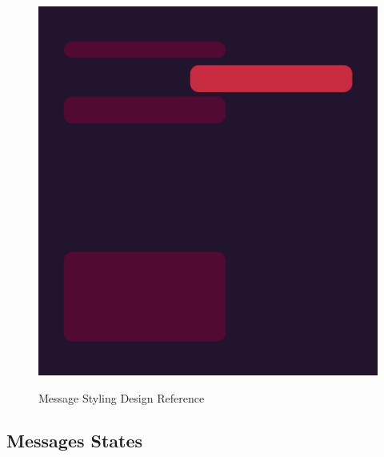 \begin{figure}[H]
    \includegraphics[width=1.0\textwidth]{./graphics/messages}\label{fig:figure2}
    \caption{Message Styling Design Reference}
\end{figure}

\subsection{Messages States}\label{subsec:messages-states}

